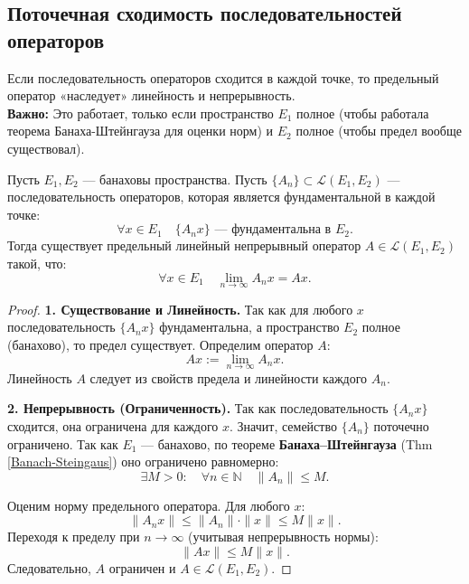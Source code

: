 
\subsection{Поточечная сходимость последовательностей операторов}

\begin{idea}
	Если последовательность операторов сходится в каждой точке, то предельный оператор «наследует» линейность и непрерывность.
	\\
	\textbf{Важно:} Это работает, только если пространство $E_1$ полное (чтобы работала теорема Банаха-Штейнгауза для оценки норм) и $E_2$ полное (чтобы предел вообще существовал).
\end{idea}

\begin{theorem}
	Пусть $E_1, E_2$ --- банаховы пространства.
	Пусть $\{A_n\} \subset \mathcal{L}(E_1, E_2)$ --- последовательность операторов, которая является фундаментальной в каждой точке:
	\[ \forall x \in E_1 \quad \{A_n x\} \text{ --- фундаментальна в } E_2. \]
	Тогда существует предельный линейный непрерывный оператор $A \in \mathcal{L}(E_1, E_2)$ такой, что:
	\[ \forall x \in E_1 \quad \lim_{n \to \infty} A_n x = Ax. \]
\end{theorem}

\begin{proof}
	\textbf{1. Существование и Линейность.}
	Так как для любого $x$ последовательность $\{A_n x\}$ фундаментальна, а пространство $E_2$ полное (банахово), то предел существует. Определим оператор $A$:
	\[ Ax := \lim_{n \to \infty} A_n x. \]
	Линейность $A$ следует из свойств предела и линейности каждого $A_n$.
	
	\textbf{2. Непрерывность (Ограниченность).}
	Так как последовательность $\{A_n x\}$ сходится, она ограничена для каждого $x$.
	Значит, семейство $\{A_n\}$ поточечно ограничено.
	Так как $E_1$ --- банахово, по теореме \textbf{Банаха--Штейнгауза} (Thm \ref{Banach-Steingaus}) оно ограничено равномерно:
	\[ \exists M > 0: \quad \forall n \in \mathbb{N} \quad \|A_n\| \leqslant M. \]
	
	Оценим норму предельного оператора. Для любого $x$:
	\[ \|A_n x\| \leqslant \|A_n\| \cdot \|x\| \leqslant M \|x\|. \]
	Переходя к пределу при $n \to \infty$ (учитывая непрерывность нормы):
	\[ \|Ax\| \leqslant M \|x\|. \]
	Следовательно, $A$ ограничен и $A \in \mathcal{L}(E_1, E_2)$.
\end{proof}

